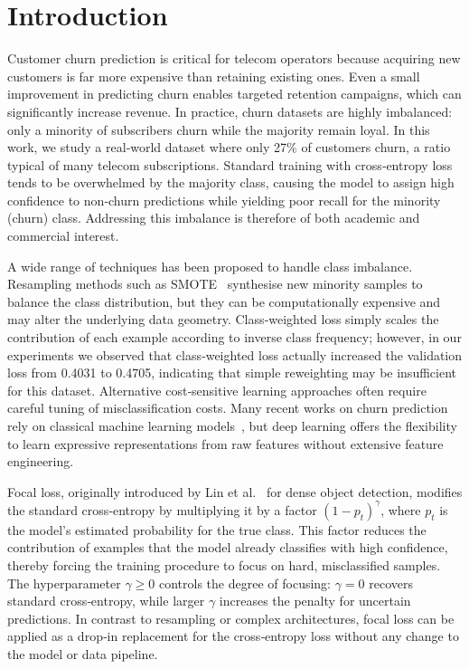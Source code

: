 \documentclass[11pt,a4paper]{article}
\begin{document}
\section{Introduction}
\label{sec:intro}
Customer churn prediction is critical for telecom operators because acquiring new customers is far more expensive than retaining existing ones. Even a small improvement in predicting churn enables targeted retention campaigns, which can significantly increase revenue. In practice, churn datasets are highly imbalanced: only a minority of subscribers churn while the majority remain loyal. In this work, we study a real‑world dataset where only 27\% of customers churn, a ratio typical of many telecom subscriptions. Standard training with cross‑entropy loss tends to be overwhelmed by the majority class, causing the model to assign high confidence to non‑churn predictions while yielding poor recall for the minority (churn) class. Addressing this imbalance is therefore of both academic and commercial interest.

A wide range of techniques has been proposed to handle class imbalance. Resampling methods such as SMOTE~\cite{chawla2002smote} synthesise new minority samples to balance the class distribution, but they can be computationally expensive and may alter the underlying data geometry. Class‑weighted loss simply scales the contribution of each example according to inverse class frequency; however, in our experiments we observed that class‑weighted loss actually increased the validation loss from 0.4031 to 0.4705, indicating that simple reweighting may be insufficient for this dataset. Alternative cost‑sensitive learning approaches often require careful tuning of misclassification costs. Many recent works on churn prediction rely on classical machine learning models~\cite{fatima2024churn}, but deep learning offers the flexibility to learn expressive representations from raw features without extensive feature engineering.

Focal loss, originally introduced by Lin et al.~\cite{lin2017focal} for dense object detection, modifies the standard cross‑entropy by multiplying it by a factor $(1-p_t)^\gamma$, where $p_t$ is the model’s estimated probability for the true class. This factor reduces the contribution of examples that the model already classifies with high confidence, thereby forcing the training procedure to focus on hard, misclassified samples. The hyperparameter $\gamma \ge 0$ controls the degree of focusing: $\gamma=0$ recovers standard cross‑entropy, while larger $\gamma$ increases the penalty for uncertain predictions. In contrast to resampling or complex architectures, focal loss can be applied as a drop‑in replacement for the cross‑entropy loss without any change to the model or data pipeline.
\end{document}
